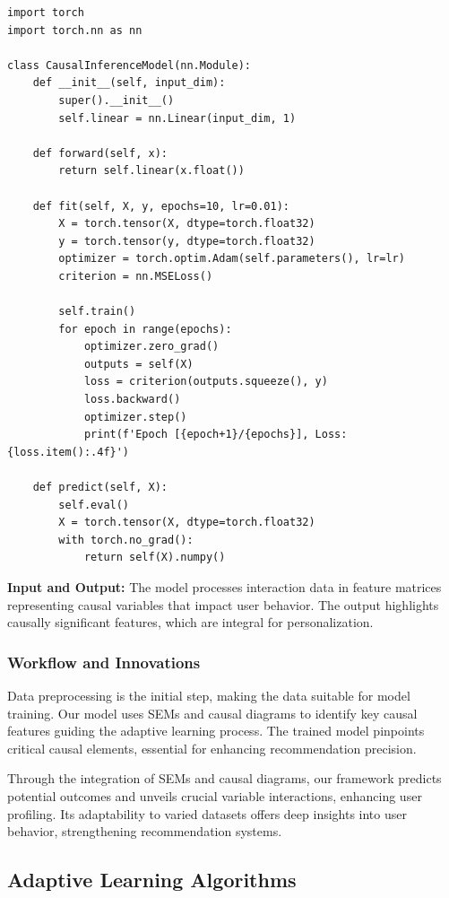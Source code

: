 \begin{lstlisting}
import torch
import torch.nn as nn

class CausalInferenceModel(nn.Module):
    def __init__(self, input_dim):
        super().__init__()
        self.linear = nn.Linear(input_dim, 1)

    def forward(self, x):
        return self.linear(x.float())

    def fit(self, X, y, epochs=10, lr=0.01):
        X = torch.tensor(X, dtype=torch.float32)
        y = torch.tensor(y, dtype=torch.float32)
        optimizer = torch.optim.Adam(self.parameters(), lr=lr)
        criterion = nn.MSELoss()

        self.train()
        for epoch in range(epochs):
            optimizer.zero_grad()
            outputs = self(X)
            loss = criterion(outputs.squeeze(), y)
            loss.backward()
            optimizer.step()
            print(f'Epoch [{epoch+1}/{epochs}], Loss: {loss.item():.4f}')
    
    def predict(self, X):
        self.eval()
        X = torch.tensor(X, dtype=torch.float32)
        with torch.no_grad():
            return self(X).numpy()
\end{lstlisting}

\textbf{Input and Output:} The model processes interaction data in feature matrices representing causal variables that impact user behavior. The output highlights causally significant features, which are integral for personalization.

\subsubsection{Workflow and Innovations}

Data preprocessing is the initial step, making the data suitable for model training. Our model uses SEMs and causal diagrams to identify key causal features guiding the adaptive learning process. The trained model pinpoints critical causal elements, essential for enhancing recommendation precision.

Through the integration of SEMs and causal diagrams, our framework predicts potential outcomes and unveils crucial variable interactions, enhancing user profiling. Its adaptability to varied datasets offers deep insights into user behavior, strengthening recommendation systems.

\subsection{Adaptive Learning Algorithms}


